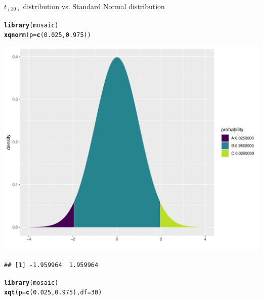 \documentclass{beamer}\usepackage[]{graphicx}\usepackage[]{color}
\newcommand{\hlnum}[1]{\textcolor[rgb]{0.686,0.059,0.569}{#1}}%
\newcommand{\hlstd}[1]{\textcolor[rgb]{0.345,0.345,0.345}{#1}}%
\newcommand{\hlkwc}[1]{\textcolor[rgb]{0.333,0.667,0.333}{#1}}%
\newcommand{\hlkwd}[1]{\textcolor[rgb]{0.737,0.353,0.396}{\textbf{#1}}}%
\newenvironment{knitrout}{}{} %
\begin{document}
\begin{frame}[fragile]{$t_{(30)}$ distribution vs. Standard Normal distribution}
\begin{minipage}{0.47\textwidth}
\begin{knitrout}\scriptsize
{}\color{fgcolor}
\begin{alltt}
\hlkwd{library}\hlstd{(mosaic)}
\hlkwd{xqnorm}\hlstd{(}\hlkwc{p} \hlstd{=} \hlkwd{c}\hlstd{(}\hlnum{0.025}\hlstd{,} \hlnum{0.975}\hlstd{))}
\end{alltt}

\end{knitrout}
\begin{knitrout}\scriptsize
{}\color{fgcolor}

{\centering \includegraphics[width=1\linewidth]{figure/unnamed-chunk-5-1} 

}


\begin{verbatim}
## [1] -1.959964  1.959964
\end{verbatim}

\end{knitrout}
\end{minipage}
\begin{minipage}{0.5\textwidth}
\begin{knitrout}\scriptsize
{}\color{fgcolor}
\begin{alltt}
\hlkwd{library}\hlstd{(mosaic)}
\hlkwd{xqt}\hlstd{(}\hlkwc{p} \hlstd{=} \hlkwd{c}\hlstd{(}\hlnum{0.025}\hlstd{,} \hlnum{0.975}\hlstd{),} \hlkwc{df} \hlstd{=} \hlnum{30}\hlstd{)}
\end{alltt}


\end{knitrout}
\end{minipage}
\end{frame}
\end{document}
